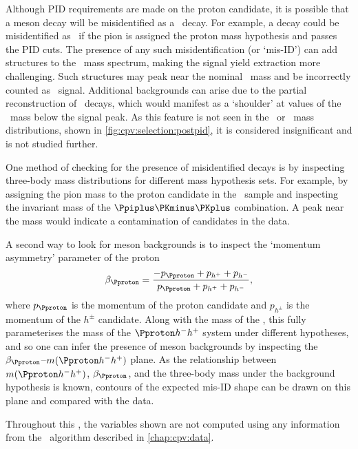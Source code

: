 Although \ac{PID} requirements are made on the proton candidate, it is possible
that a meson decay will be misidentified as a \PLambdac\ decay.
For example, a \decay{\PDsplus}{\PKminus\PKplus\Ppiplus} decay could be
misidentified as \LcTopKK\ if the pion is assigned the proton mass hypothesis
and passes the \ac{PID} cuts.
The presence of any such misidentification (or `mis-ID') can add structures to
the \PLambdac\ mass spectrum, making the signal yield extraction more
challenging.
Such structures may peak near the nominal \PLambdac\ mass and be incorrectly
counted as \PLambdac\ signal.
Additional backgrounds can arise due to the partial reconstruction of
\PLambdac\ decays, which would manifest as a `shoulder' at values of the
\PLambdac\ mass below the signal peak.
As this feature is not seen in the \pKK\ or \ppipi\ mass distributions, shown
in \cref{fig:cpv:selection:postpid}, it is considered insignificant and is not
studied further.

One method of checking for the presence of misidentified decays is by
inspecting three-body mass distributions for different mass hypothesis sets.
For example, by assigning the pion mass to the proton candidate in the \pKK\
sample and inspecting the invariant mass of the $\Ppiplus\PKminus\PKplus$
combination.
A peak near the \PDsplus mass would indicate a contamination of \PDsplus
candidates in the data.

A second way to look for meson backgrounds is to inspect the `momentum
asymmetry' parameter of the proton~\cite{Aaltonen:2011jv,Artuso:2121282}
\begin{equation}
  \beta_{\Pproton} = \frac{-p_{\Pproton} + p_{\Php} + p_{\Phm}}{p_{\Pproton} + p_{\Php} + p_{\Phm}},
  \label{eqn:cpv:selection:background_study:mom_asym}
\end{equation}
where $p_{\Pproton}$ is the momentum of the proton candidate and $p_{h^{\pm}}$
is the momentum of the $h^{\pm}$ candidate.
Along with the mass of the \PLambdac, this fully parameterises the mass of the
$\phh$ system under different hypotheses, and so one can infer the presence of
meson backgrounds by inspecting the $\beta_{\Pproton}$--$m(\phh)$ plane.
As the relationship between $m(\phh)$, $\beta_{\Pproton}$, and the three-body
mass under the background hypothesis is known, contours of the expected mis-ID
shape can be drawn on this plane and compared with the data.

Throughout this , the variables
shown are not computed using any information from the \decaytreefitter\
algorithm described in \cref{chap:cpv:data}.

